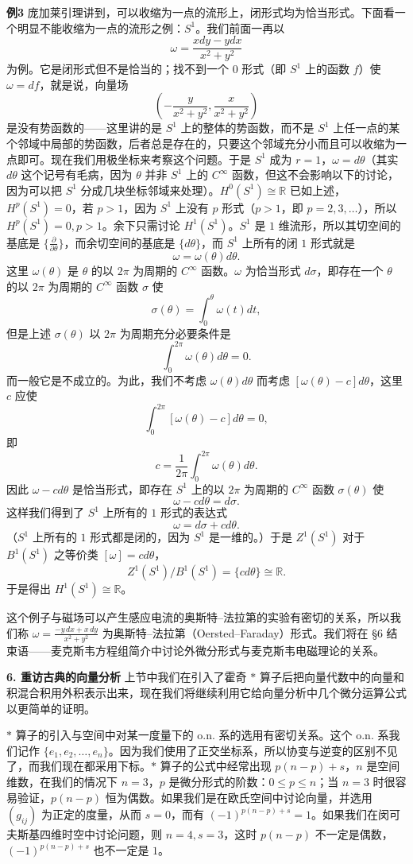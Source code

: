 \noindent\textbf{例3}\quad
庞加莱引理讲到，可以收缩为一点的流形上，闭形式均为恰当形式。下面看一个明显不能收缩为一点的流形之例：$S^1$。我们前面一再以
\[
 \omega=\frac{xdy-ydx}{x^2+y^2}
\]
为例。它是闭形式但不是恰当的；找不到一个 $0$ 形式（即 $S^1$ 上的函数 $f$）使 $\omega=df$，就是说，向量场
\[
 \left(-\frac{y}{x^2+y^2},\frac{x}{x^2+y^2}\right)
\]
是没有势函数的——这里讲的是 $S^1$ 上的整体的势函数，而不是 $S^1$ 上任一点的某个邻域中局部的势函数，后者总是存在的，只要这个邻域充分小而且可以收缩为一点即可。现在我们用极坐标来考察这个问题。于是 $S^1$ 成为 $r=1$，$\omega=d\theta$（其实 $d\theta$ 这个记号有毛病，因为 $\theta$ 并非 $S^1$ 上的 $C^\infty$ 函数，但这不会影响以下的讨论，因为可以把 $S^1$ 分成几块坐标邻域来处理）。$H^0(S^1)\cong\mathbb R$ 已如上述，$H^p(S^1)=0$，若 $p>1$，因为 $S^1$ 上没有 $p$ 形式（$p>1$，即 $p=2,3,\ldots$），所以 $H^p(S^1)=0,p>1$。余下只需讨论 $H^1(S^1)$。$S^1$ 是 $1$ 维流形，所以其切空间的基底是 $\{\frac{\partial}{\partial\theta}\}$，而余切空间的基底是 $\{d\theta\}$，而 $S^1$ 上所有的闭 $1$ 形式就是
\[
 \omega=\omega(\theta)d\theta.
\]
这里 $\omega(\theta)$ 是 $\theta$ 的以 $2\pi$ 为周期的 $C^\infty$ 函数。$\omega$ 为恰当形式 $d\sigma$，即存在一个 $\theta$ 的以 $2\pi$ 为周期的 $C^\infty$ 函数 $\sigma$ 使
\[
 \sigma(\theta)=\int_0^\theta\omega(t)dt,
\]
但是上述 $\sigma(\theta)$ 以 $2\pi$ 为周期充分必要条件是
\[
 \int_0^{2\pi}\omega(\theta)d\theta=0.
\]
而一般它是不成立的。为此，我们不考虑 $\omega(\theta)d\theta$ 而考虑 $[\omega(\theta)-c]d\theta$，这里 $c$ 应使
\[
 \int_0^{2\pi}[\omega(\theta)-c]d\theta=0,
\]
即
\[
 c=\frac1{2\pi}\int_0^{2\pi}\omega(\theta)d\theta.
\]
因此 $\omega-cd\theta$ 是恰当形式，即存在 $S^1$ 上的以 $2\pi$ 为周期的 $C^\infty$ 函数 $\sigma(\theta)$ 使
\[
 \omega-cd\theta=d\sigma.
\]
这样我们得到了 $S^1$ 上所有的 $1$ 形式的表达式
\[
 \omega=d\sigma+cd\theta.
\]
（$S^1$ 上所有的 $1$ 形式都是闭的，因为 $S^1$ 是一维的。）于是 $Z^1(S^1)$ 对于 $B^1(S^1)$ 之等价类 $[\omega]=cd\theta$，
\[
 Z^1(S^1)/B^1(S^1)=\{cd\theta\}\cong\mathbb R.
\]
于是得出 $H^1(S^1)\cong\mathbb R$。

这个例子与磁场可以产生感应电流的奥斯特--法拉第的实验有密切的关系，所以我们称 $\omega=\frac{-y\,dx+x\,dy}{x^2+y^2}$ 为奥斯特--法拉第（Oersted--Faraday）形式。我们将在 §6 结束语——麦克斯韦方程组简介中讨论外微分形式与麦克斯韦电磁理论的关系。

\noindent\textbf{6. 重访古典的向量分析}\quad
上节中我们在引入了霍奇 $*$ 算子后把向量代数中的向量和积混合积用外积表示出来，现在我们将继续利用它给向量分析中几个微分运算公式以更简单的证明。

$*$ 算子的引入与空间中对某一度量下的 o.n. 系的选用有密切关系。这个 o.n. 系我们记作 $\{e_1,e_2,\ldots,e_n\}$。因为我们使用了正交坐标系，所以协变与逆变的区别不见了，而我们现在都采用下标。$*$ 算子的公式中经常出现 $p(n-p)+s$，$n$ 是空间维数，在我们的情况下 $n=3$，$p$ 是微分形式的阶数：$0\le p\le n$；当 $n=3$ 时很容易验证，$p(n-p)$ 恒为偶数。如果我们是在欧氏空间中讨论向量，并选用 $(g_{ij})$ 为正定的度量，从而 $s=0$，而有 $(-1)^{p(n-p)+s}=1$。如果我们在闵可夫斯基四维时空中讨论问题，则 $n=4,s=3$，这时 $p(n-p)$ 不一定是偶数，$(-1)^{p(n-p)+s}$ 也不一定是 $1$。

